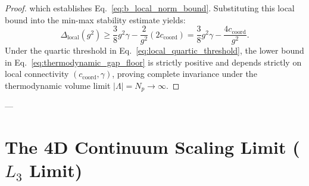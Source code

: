 \documentclass[11pt,reqno]{article}
\begin{document}
\begin{proof}
which establishes Eq.~\eqref{eq:b_local_norm_bound}.
Substituting this local bound into the min-max stability estimate yields:
\begin{equation}
    \Delta_{\mathrm{local}}(g^2) \ge \frac{3}{8} g^2 \gamma - \frac{2}{g^2}(2 c_{\mathrm{coord}}) = \frac{3}{8} g^2 \gamma - \frac{4 c_{\mathrm{coord}}}{g^2}.
\end{equation}
Under the quartic threshold in Eq.~\eqref{eq:local_quartic_threshold}, the lower bound in Eq.~\eqref{eq:thermodynamic_gap_floor} is strictly positive and depends strictly on local connectivity $(c_{\mathrm{coord}}, \gamma)$, proving complete invariance under the thermodynamic volume limit $|\Lambda| = N_p \to \infty$.
\end{proof}

---

\section{The 4D Continuum Scaling Limit ($L_3$ Limit)}
\label{sec:continuum}
\end{document}

